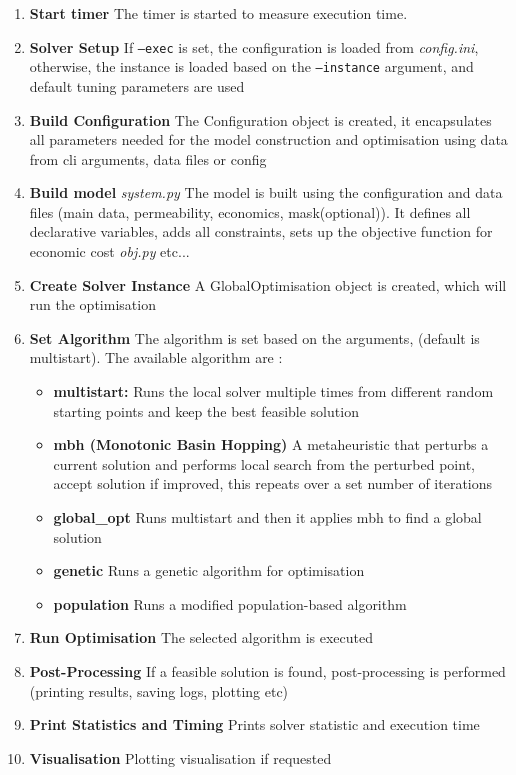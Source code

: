 \documentclass[12pt]{article}
\theoremstyle{definition}
\theoremstyle{definition}
\theoremstyle{remark}
\theoremstyle{remark}
\theoremstyle{definition}
\theoremstyle{remark}
\begin{document}
			\newpage
			\setcounter{enumi}{3}
			\begin{enumerate}[resume]
			\item \textbf{Start timer} The timer is started to measure execution time.
				
			\item \textbf{Solver Setup} If \texttt{--exec} is set, the configuration is loaded from \emph{config.ini}, otherwise, the instance is loaded based on the \texttt{--instance} argument, and default tuning parameters are used
			\item \textbf{Build Configuration} The Configuration object is created, it encapsulates all parameters needed for the model construction and optimisation using data from cli arguments, data files or config
			\item \textbf{Build model} \emph{system.py} The model is built using the configuration and data files (main data, permeability, economics, mask(optional)). It defines all declarative variables, adds all constraints, sets up the objective function for economic cost \emph{obj.py} etc...
			\item \textbf{Create Solver Instance} A GlobalOptimisation object is created, which will run the optimisation
			\item \textbf{Set Algorithm} The algorithm is set based on the arguments, (default is multistart). The available algorithm are : 
				\begin{itemize}
					\item \textbf{multistart:} Runs the local solver multiple times from different random starting points and keep the best feasible solution
					\item \textbf{mbh (Monotonic Basin Hopping)} A metaheuristic that perturbs a current solution and performs local search from the perturbed point, accept solution if improved, this repeats over a set number of iterations
					\item \textbf{global\_opt} Runs multistart and then it applies mbh to find a global solution
					\item \textbf{genetic} Runs a genetic algorithm for optimisation
					\item \textbf{population} Runs a modified population-based algorithm
					
				\end{itemize}

			\item \textbf{Run Optimisation} The selected algorithm is executed
			\item \textbf{Post-Processing} If a feasible solution is found, post-processing is performed (printing results, saving logs, plotting etc)
			\item \textbf{Print Statistics and Timing} Prints solver statistic and execution time  
			\item \textbf{Visualisation} Plotting visualisation if requested
			\end{enumerate}
			
\end{document}
